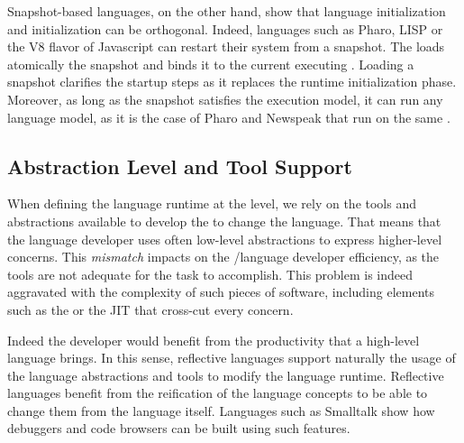 Snapshot-based languages, on the other hand, show that language initialization and \VM initialization can be orthogonal. Indeed, languages such as Pharo, LISP or the V8 flavor of Javascript can restart their system from a snapshot. The \VM loads atomically the snapshot and binds it to the current executing \VM. Loading a snapshot clarifies the \VM startup steps as it replaces the runtime initialization phase. Moreover, as long as the snapshot satisfies the \VM execution model, it can run any language model, as it is the case of Pharo and Newspeak that run on the same \VM.



\subsection*{Abstraction Level and Tool Support}

When defining the language runtime at the \VM level, we rely on the tools and abstractions available to develop the \VM to change the language. That means that the language developer uses often low-level abstractions to express higher-level concerns. This \emph{mismatch} impacts on the \VM/language developer efficiency, as the tools are not adequate for the task to accomplish. This problem is indeed aggravated with the complexity of such pieces of software, including elements such as the \GC or the JIT that cross-cut every \VM concern.

Indeed the developer would benefit from the productivity that a high-level language brings. In this sense, reflective languages support naturally the usage of the language abstractions and tools to modify the language runtime. Reflective languages benefit from the reification of the language concepts to be able to change them from the language itself. Languages such as Smalltalk show how debuggers and code browsers can be built using such features.


